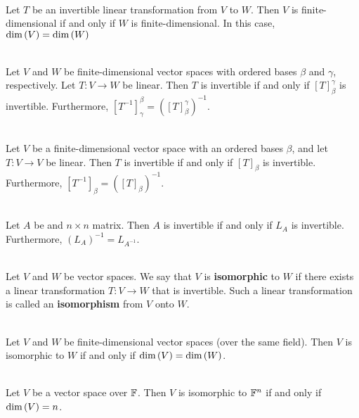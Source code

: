 \begin{lemma}
	\hfill\\
	Let $T$ be an invertible linear transformation from $V$ to $W$. Then $V$ is finite-dimensional if and only if $W$ is finite-dimensional. In this case, $\text{dim}\left(V\right) = \text{dim}\left(W\right)$
\end{lemma}

\begin{theorem}
	\hfill\\
	Let $V$ and $W$ be finite-dimensional vector spaces with ordered bases $\beta$ and $\gamma$, respectively. Let $T: V \to W$ be linear. Then $T$ is invertible if and only if $[T]_\beta^\gamma$ is invertible. Furthermore, $[T^{-1}]_\gamma^\beta = ([T]_\beta^\gamma)^{-1}$.
\end{theorem}

\begin{corollary}
	\hfill\\
	Let $V$ be a finite-dimensional vector space with an ordered bases $\beta$, and let $T: V \to V$ be linear. Then $T$ is invertible if and only if $[T]_\beta$ is invertible. Furthermore, $[T^{-1}]_\beta = ([T]_\beta)^{-1}$.
\end{corollary}

\begin{corollary}
	\hfill\\
	Let $A$ be and $n \times n$ matrix. Then $A$ is invertible if and only if $L_A$ is invertible. Furthermore, $(L_A)^{-1} = L_{A^{-1}}$.
\end{corollary}

\begin{definition}
	\hfill\\
	Let $V$ and $W$ be vector spaces. We say that $V$ is \textbf{isomorphic} to $W$ if there exists a linear transformation $T: V \to W$ that is invertible. Such a linear transformation is called an \textbf{isomorphism} from $V$ onto $W$.
\end{definition}

\begin{theorem}\label{Theorem 2.19}
	\hfill\\
	Let $V$ and $W$ be finite-dimensional vector spaces (over the same field). Then $V$ is isomorphic to $W$ if and only if $\text{dim}\left(V\right) = \text{dim}\left(W\right)$.
\end{theorem}

\begin{corollary}
	\hfill\\
	Let $V$ be a vector space over $\mathbb{F}$. Then $V$ is isomorphic to $\mathbb{F}^n$ if and only if $\text{dim}\left(V\right) = n$.
\end{corollary}

